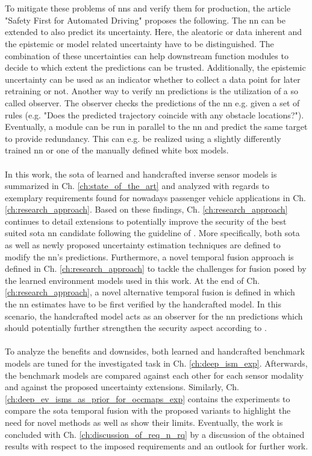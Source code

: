\\\\
To mitigate these problems of \gls{nn}s and verify them for production, the article "Safety First for Automated Driving" \cite{safetyfirst2019} proposes the following. The \gls{nn} can be extended to also predict its uncertainty. Here, the aleatoric or data inherent and the epistemic or model related uncertainty have to be distinguished. The combination of these uncertainties can help downstream function modules to decide to which extent the predictions can be trusted. Additionally, the epistemic uncertainty can be used as an indicator whether to collect a data point for later retraining or not. Another way to verify \gls{nn} predictions is the utilization of a so called observer. The observer checks the predictions of the \gls{nn} e.g. given a set of rules (e.g. "Does the predicted trajectory coincide with any obstacle locations?"). Eventually, a module can be run in parallel to the \gls{nn} and predict the same target to provide redundancy. This can e.g. be realized using a slightly differently trained \gls{nn} or one of the manually defined white box models.
\\\\
In this work, the \gls{sota} of learned and handcrafted inverse sensor models is summarized in Ch. \ref{ch:state_of_the_art} and analyzed with regards to exemplary requirements found for nowadays passenger vehicle applications in Ch. \ref{ch:research_approach}. Based on these findings, Ch. \ref{ch:research_approach} continues to detail extensions to potentially improve the security of the best suited \gls{sota} \gls{nn} candidate following the guideline of \cite{safetyfirst2019}. More specifically, both \gls{sota} as well as newly proposed uncertainty estimation techniques are defined to modify the \gls{nn}'s predictions. Furthermore, a novel temporal fusion approach is defined in Ch. \ref{ch:research_approach} to tackle the challenges for fusion posed by the learned environment models used in this work. At the end of Ch. \ref{ch:research_approach}, a novel alternative temporal fusion is defined in which the \gls{nn} estimates have to be first verified by the handcrafted model. In this scenario, the handcrafted model acts as an observer for the \gls{nn} predictions which should potentially further strengthen the security aspect according to \cite{safetyfirst2019}.
\\\\
To analyze the benefits and downsides, both learned and handcrafted benchmark models are tuned for the investigated task in Ch. \ref{ch:deep_ism_exp}. Afterwards, the benchmark models are compared against each other for each sensor modality and against the proposed uncertainty extensions. Similarly, Ch. \ref{ch:deep_ev_isms_as_prior_for_occmaps_exp} contains the experiments to compare the \gls{sota} temporal fusion with the proposed variants to highlight the need for novel methods as well as show their limits. Eventually, the work is concluded with Ch. \ref{ch:discussion_of_req_n_rq} by a discussion of the obtained results with respect to the imposed requirements and an outlook for further work.

